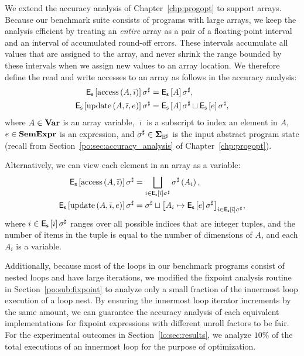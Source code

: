 We extend the accuracy analysis of Chapter~\ref{chp:progopt} to support arrays.
Because our benchmark suite consists of programs with large arrays, we keep
the analysis efficient by treating an \emph{entire} array as a pair of a
floating-point interval and an interval of accumulated round-off errors.  These
intervals accumulate all values that are assigned to the array, and never
shrink the range bounded by these intervals when we assign new values to an
array location.  We therefore define the read and write accesses to an array as
follows in the accuracy analysis:
\begin{equation}
    \begin{aligned}
        \operatorname{\mathsf{E}_\mathsf{s}}\left[{\operatorname{\mathrm{access}}\left({A}, {\bar\imath}\right)}\right]\sigma^\sharp
        &= \operatorname{\mathsf{E}_\mathsf{s}}\left[{A}\right]\sigma^\sharp, \\
        \operatorname{\mathsf{E}_\mathsf{s}}\left[{\operatorname{\mathrm{update}}\left({A}, {\bar\imath}, {e}\right)}\right]\sigma^\sharp
        &= \operatorname{\mathsf{E}_\mathsf{s}}\left[{A}\right]\sigma^\sharp \sqcup
           \operatorname{\mathsf{E}_\mathsf{s}}\left[{e}\right]\sigma^\sharp,
    \end{aligned}
\end{equation}
where $A \in \mathbf{Var}$ is an array variable, $\bar\imath$ is a subscript
to index an element in $A$, $e \in \mathbf{SemExpr}$ is an expression, and
$\sigma^\sharp \in \mathbf{\Sigma}_{\mathbb{E}^\sharp}$ is the input abstract program state (recall from
Section~\ref{po:sec:accuracy_analysis} of Chapter~\ref{chp:progopt}).

Alternatively, we can view each element in an array as a variable:
\begin{equation}
    \begin{aligned}
        \operatorname{\mathsf{E}_\mathsf{s}}\left[{\operatorname{\mathrm{access}}\left({A}, {\bar\imath}\right)}\right]\sigma^\sharp
        &= \bigsqcup_{i \in \operatorname{\mathsf{E}_\mathsf{s}}\left[{\bar\imath}\right]\sigma^\sharp}
            \sigma^\sharp \left( A_i \right), \\
        \operatorname{\mathsf{E}_\mathsf{s}}\left[{\operatorname{\mathrm{update}}\left({A}, {\bar\imath}, {e}\right)}\right]\sigma^\sharp
        &= \sigma^\sharp \sqcup {\left[
            A_i \mapsto \ensuremath{\operatorname{\mathsf{E}_\mathsf{s}}}\left[{e}\right]\sigma^\sharp
        \right]}_{i \in \operatorname{\mathsf{E}_\mathsf{s}}\left[{\bar\imath}\right]\sigma^\sharp},
    \end{aligned}
\end{equation}
where $i \in \operatorname{\mathsf{E}_\mathsf{s}}\left[{\bar\imath}\right]\sigma^\sharp$ ranges over all possible
indices that are integer tuples, and the number of items in the tuple is equal
to the number of dimensions of $A$, and each $A_i$ is a variable.

Additionally, because most of the loops in our benchmark programs consist of
nested loops and have large iterations, we modified the fixpoint analysis
routine in Section~\ref{po:sub:fixpoint} to analyze only a small fraction
of the innermost loop execution of a loop nest.  By ensuring the innermost
loop iterator increments by the same amount, we can guarantee the accuracy
analysis of each equivalent implementations for fixpoint expressions with
different unroll factors to be fair.  For the experimental outcomes in
Section~\ref{lo:sec:results}, we analyze $10\%$ of the total executions of an
innermost loop for the purpose of optimization.

